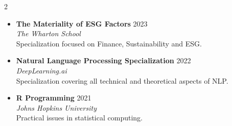 \begin{cventries}
\begin{multicols}{2}
\begin{itemize}[leftmargin=*, nosep, label={}]
  \item \textbf{The Materiality of ESG Factors} \hfill {\color{awesome-skyblue} 2023} \\
  \textit{The Wharton School} \\
  Specialization focused on Finance, Sustainability and ESG.
  \vspace{2pt}

  \item \textbf{Natural Language Processing Specialization} \hfill {\color{awesome-skyblue} 2022} \\
  \textit{DeepLearning.ai} \\
  Specialization covering all technical and theoretical aspects of NLP.
  \vspace{2pt}

  \item \textbf{R Programming} \hfill {\color{awesome-skyblue} 2021} \\
  \textit{Johns Hopkins University} \\
  Practical issues in statistical computing.
\end{itemize}
\end{multicols}
\end{cventries}

